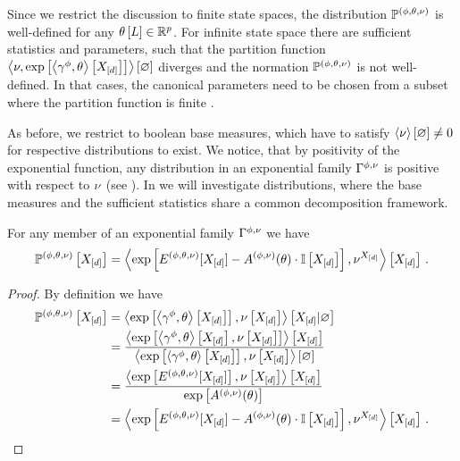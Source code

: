 Since we restrict the discussion to finite state spaces, the distribution $\mathbb{P}^{(\phi,\theta,\nu)}$ is well-defined for any $\theta\left[L\right]\in\mathbb{R}^{p}$.
For infinite state space there are sufficient statistics and parameters, such that the partition function $\left\langle \nu,\mathrm{exp}\left[\left\langle \gamma^{\phi},\theta\right\rangle \left[ X_{[d]} \right]\right]\right\rangle \left[ \varnothing \right]$ diverges and the normation $\mathbb{P}^{(\phi,\theta,\nu)}$ is not well-defined.
In that cases, the canonical parameters need to be chosen from a subset where the partition function is finite \cite{wainwright_graphical_2008}.

As before, we restrict to boolean base measures, which have to satisfy $\left\langle \nu\right\rangle \left[ \varnothing \right]\neq0$ for respective distributions to exist.
We notice, that by positivity of the exponential function, any distribution in an exponential family $\Gamma^{\phi,\nu}$ is positive with respect to $\nu$ (see ).
In  we will investigate distributions, where the base measures and the sufficient statistics share a common decomposition framework.

\begin{lemma}
    \label{lem:energyCumulantRepresentation}
    For any member of an exponential family $\Gamma^{\phi,\nu}$ we have
    \begin{align*}
        \mathbb{P}^{(\phi,\theta,\nu)}\left[X_{[d]}\right]
        = \left\langle \mathrm{exp}\left[ E^{(\phi,\theta,\nu)}[X_{[d]}] - A^{(\phi,\nu)}(\theta)\cdot \mathbb{I}\left[X_{[d]}\right]\right],\nu^{X_{[d]}}\right\rangle \left[ X_{[d]} \right] \, .
    \end{align*}
\end{lemma}
\begin{proof}
    By definition we have
    \begin{align*}
        \mathbb{P}^{(\phi,\theta,\nu)}\left[X_{[d]}\right]
        &= \left\langle 
            \mathrm{exp}\left[\left\langle \gamma^{\phi},\theta\right\rangle \left[ X_{[d]} \right]\right],\nu\left[X_{[d]}\right]
        \right\rangle \left[ X_{[d]} | \varnothing \right] \\
        &= \frac{\left\langle \mathrm{exp}\left[\left\langle \gamma^{\phi},\theta\right\rangle \left[ X_{[d]} \right],\nu\left[X_{[d]}\right]\right]\right\rangle \left[ X_{[d]} \right]
        }{\left\langle \mathrm{exp}\left[\left\langle \gamma^{\phi},\theta    \right\rangle \left[ X_{[d]} \right]\right],\nu\left[X_{[d]}\right]\right\rangle \left[ \varnothing \right]} \\
        &=  \frac{
            \left\langle \mathrm{exp}\left[E^{(\phi,\theta,\nu)}[X_{[d]}]\right],\nu\left[X_{[d]}\right]\right\rangle \left[ X_{[d]} \right]
        }{
            \mathrm{exp}\left[A^{(\phi,\nu)}(\theta)\right]
        } \\
        & = \left\langle \mathrm{exp}\left[ E^{(\phi,\theta,\nu)}[X_{[d]}] - A^{(\phi,\nu)}(\theta)\cdot \mathbb{I}\left[X_{[d]}\right]\right],\nu^{X_{[d]}}\right\rangle \left[ X_{[d]} \right] \, .
    \end{align*}
\end{proof}


